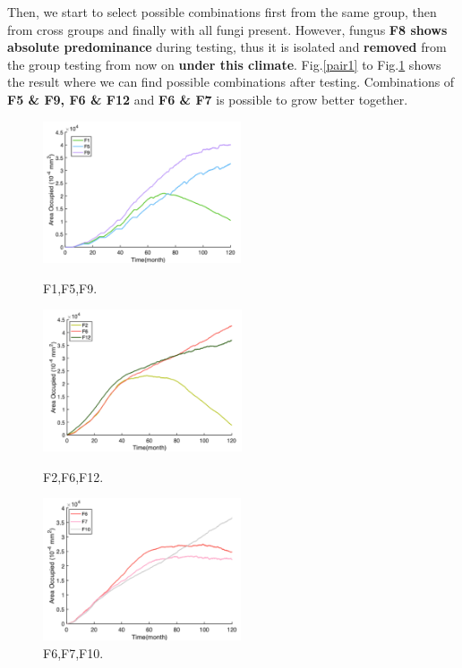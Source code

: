 \documentclass[a4paper,12pt]{article}
\begin{document}
Then, we start to select possible combinations first from the same group, then from cross groups and finally with all fungi present.  However, fungus \textbf{F8 shows absolute predominance} during testing, thus it is isolated and \textbf{removed} from the group testing from now on \textbf{under this climate}. Fig.\ref{pair1} to Fig.\ref{pair3} shows the result where we can find possible combinations after testing. Combinations of \textbf{F5 \& F9, F6 \& F12} and \textbf{F6 \& F7} is possible to grow better together.
\begin{figure}[H]
	\begin{minipage}{30ex}
	\includegraphics[height=4.2cm]{./formal/tropical/159[3].png}
	\caption{F1,F5,F9.}
	\label{pair1}
\end{minipage}   
\begin{minipage}{30.5ex}
\centering
	\includegraphics[height=4.2cm]{./formal/tropical/2612[2].png}
	\caption{F2,F6,F12.}
	\label{pair2}
\end{minipage}
\begin{minipage}{29ex}
\centering
	\includegraphics[height=4.2cm]{./formal/tropical/6710[3].png}
	\caption{F6,F7,F10.}
	\label{pair3}
\end{minipage} 
\end{figure}
\end{document}
